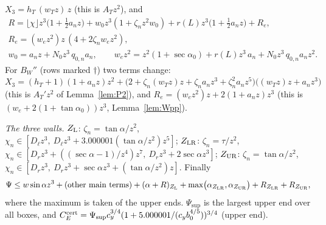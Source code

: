 \documentclass[11pt]{amsart}
\newcommand{\sa}{\sin\alpha}
\newcommand{\ta}{\tan\alpha}
\newcommand{\se}{\sec\alpha}
\newcommand{\taz}{\tan\alpha_0}
\newcommand{\sez}{\sec\alpha_0}
\theoremstyle{definition}
\theoremstyle{remark}
\numberwithin{equation}{section}
\begin{document}
$X_3=h_T\,(w_Tz)\,z$ (this is $A_Tz^2$), and
\begin{gather*}
R=\lfloor\chi\rfloor z^3\bigl(1+\tfrac12a_nz\bigr)+w_0z^3(1+\zeta_nz^2w_0)+r(L)z^3\bigl(1+\tfrac12a_nz\bigr)+R_e,\\
R_e=(w_ez^2)z\,(4+2\zeta_nw_ez^2),\\
w_0=a_nz+N_0z^3\,q_{0,n}a_n,\qquad w_ez^2=z^2(1+\sez)+r(L)z^3\,a_n+N_0z^3\,q_{0,n}a_nz^2 .
\end{gather*}
For $B_W''$ (rows marked $\dagger$) two terms change:
$X_3=(h_T+1)(1+a_nz)z^2+\bigl(2+\zeta_n(w_Tz)z+\zeta_na_nz^3+\zeta_n^2a_nz^5\bigr)\bigl((w_Tz)z+a_nz^3\bigr)$ (this is
$A_T'z^2$ of Lemma~\ref{lem:P2}), and $R_e=(w_ez^2)z+2(1+a_nz)z^3$ (this is $(w_e+2(1+\taz))z^3$, Lemma~\ref{lem:Wpp}).

\emph{The three walls.} $Z_{\rm L}$: $\zeta_n=\ta/z^2$, $\chi_n\in[D_\ell z^3,\ D_\ell z^3+3.000001(\ta/z^2)z^5]$;
$Z_{\rm LR}$: $\zeta_n=\tau/z^2$, $\chi_n\in[D_rz^3+((\se-1)/z^4)z^7,\ D_rz^3+2\se z^3]$; $Z_{\rm UR}$: $\zeta_n=\ta/z^2$,
$\chi_n\in[D_rz^3,\ D_rz^3+\se z^3+(\ta/z^2)z]$. Finally
\[
\Psi\le w\sa z^3+(\text{other main terms})+(\alpha+R)_{Z_{\rm L}}+\max\bigl(\alpha_{Z_{\rm LR}},\alpha_{Z_{\rm UR}}\bigr)
+R_{Z_{\rm LR}}+R_{Z_{\rm UR}},
\]
where the maximum is taken of the upper ends. $\Psi_{\sup}$ is the largest upper end over all boxes, and
$C_E^{\rm cert}=\Psi_{\sup}c_y^{3/4}(1+5.000001/(c_yb_0^{4/5}))^{3/4}$ (upper end).
\end{document}
